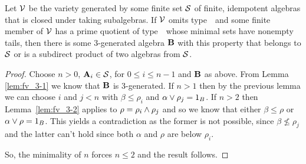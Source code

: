 

\begin{theorem}\label{thm:fv_3-4}
Let $\mathcal{V}$ be the variety generated by some finite set $\mathcal{S}$ of finite,
idempotent algebras that is closed under taking subalgebras. If\/ $\mathcal{V}$
omits type~\utyp\ and some finite member of $\mathcal{V}$ has a prime quotient
of type~\atyp\
whose minimal sets have nonempty tails, then there is some
3-generated algebra $\mathbf{B}$ with this property that belongs to $\mathcal{S}$ or is a subdirect
product of two algebras from $\mathcal{S}$.
\end{theorem}
\begin{proof}
Choose $n > 0$, $\mathbf{A}_i \in \mathcal{S}$, for $0 \le i \le n-1$ and $\mathbf{B}$
as above. From Lemma \ref{lem:fv_3-1} we know that $\mathbf{B}$ is
3-generated. If $n > 1$ then by the previous lemma we can choose $i$
and $j < n$ with $\beta \le \rho_i$ and $\alpha \join \rho_j =
1_B$. If $n > 2$ then Lemma~\ref{lem:fv_3-2} applies to $\rho = \rho_i
\meet \rho_j$ and so we know that either $\beta \le \rho$ or $\alpha
\join \rho = 1_B$. This yields a contradiction as the former is not
possible, since $\beta \not\le \rho_j$ and the latter can't hold
since both $\alpha$ and $\rho$ are below $\rho_i$.

So, the minimality of $n$ forces $n\le 2$ and the result follows.
\end{proof}


